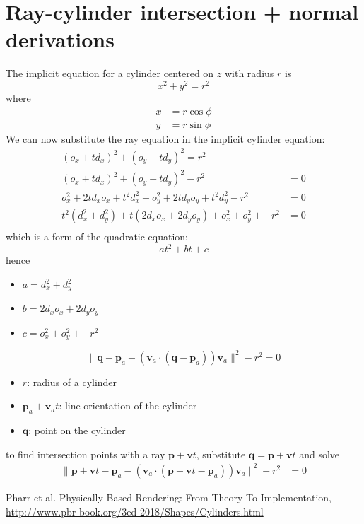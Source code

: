 \documentclass[a4paper, 12pt]{article}
\begin{document}
\section{Ray-cylinder intersection + normal derivations}
The implicit equation for a cylinder centered on $z$ with radius $r$ is
$$
x^2 + y^2 = r^2
$$
where
\begin{align*}
  x&=r\cos\phi\\
  y&=r\sin\phi
\end{align*}
We can now substitute the ray equation in the implicit cylinder equation:
\begin{align*}
(o_x+ td_x)^2 + (o_y+ td_y)^2 = r^2\\
(o_x+ td_x)^2 + (o_y+ td_y)^2 -  r^2 &= 0\\
o_x^2 + 2td_xo_x + t^2d_x^2 + o_y^2 + 2td_yo_y + t^2d_y^2-  r^2 &= 0\\
t^2(d_x^2 + d_y^2) + t(2d_xo_x + 2d_yo_y) + o_x^2  + o_y^2 +  - r^2 &= 0\\
\end{align*}
which is a form of the quadratic equation:
$$
at^2 + bt + c
$$
hence
\begin{itemize}
  \item $a = d_x^2 + d_y^2$
  \item $b = 2d_xo_x + 2d_yo_y$
  \item $c = o_x^2  + o_y^2 +  - r^2$
\end{itemize}
$$
\|\textbf{q} - \textbf{p}_a - (\textbf{v}_a \cdot (\textbf{q} - \textbf{p}_a))\textbf{v}_a\|^2 - r^2 = 0
$$
\begin{itemize}
  \item $r$: radius of a cylinder 
  \item $\textbf{p}_a + \textbf{v}_at$: line orientation of the cylinder
  \item $\textbf{q}$: point on the cylinder
\end{itemize}
to find intersection points with a ray $\textbf{p} + \textbf{v}t$, substitute $\textbf{q} = \textbf{p} + \textbf{v}t$ and solve
\begin{align*}
\|\textbf{p} + \textbf{v}t - \textbf{p}_a - (\textbf{v}_a \cdot (\textbf{p} + \textbf{v}t - \textbf{p}_a))\textbf{v}_a\|^2 - r^2 &= 0
\end{align*}
\begin{thebibliography}{10} %
   Pharr et al. Physically Based Rendering:
  From Theory To Implementation, \url{http://www.pbr-book.org/3ed-2018/Shapes/Cylinders.html}%

\end{thebibliography}
\end{document}
